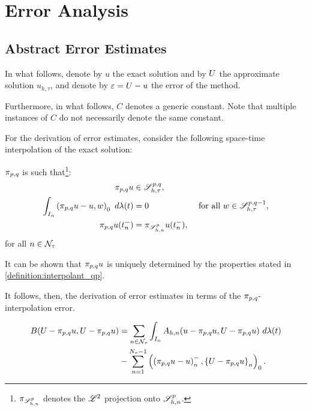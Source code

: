 \newpage
\section{Error Analysis}

\subsection{Abstract Error Estimates}

In what follows, denote by $u$ the exact solution and by $U$ the approximate solution $u_{h, \tau}$, and denote by $\varepsilon = U - u$ the error of the method.

Furthermore, in what follows, $C$ denotes a generic constant. Note that multiple instances of $C$ do not necessarily denote the same constant.

For the derivation of error estimates, consider the following space-time interpolation of the exact solution:

\begin{definition}[$\InterpolantPQ$] \label{definition:interpolant_qp}
    $\InterpolantPQ$ is such that\footnote{$\pi_{\mathscr{S}^p_{h, n}}$ denotes the $\mathscr{L}^{2}$ projection onto $\mathscr{S}^p_{h, n}$.}:
    \begin{align}
        \pi_{p, q} u &\in \mathscr{S}^{p, q}_{h, \tau}, \\
        \int_{I_n} \left( \pi_{p, q} u - u, w \right)_0 ~ d \lambda(t) &= 0 &\text{ for all } w \in \mathscr{S}^{p, q - 1}_{h, \tau}, \\
        \pi_{p, q} u(t_n^-) &= \pi_{\mathscr{S}^p_{h, n}} u(t_n^-),
    \end{align}
    for all $n \in \mathcal{N}_{\tau}$
\end{definition}

It can be shown that $\pi_{p, q} u$ is uniquely determined by the properties stated in \cref{definition:interpolant_qp}.

It follows, then, the derivation of error estimates in terms of the $\InterpolantPQ$-interpolation error.

\begin{lemma}
    \begin{align}
        B(U - \pi_{p, q} u, U - \pi_{p, q} u) &= \sum_{n \in \mathcal{N}_{\tau}} \int_{I_n} A_{h, n}(u - \pi_{p, q} u, U - \pi_{p, q} u) ~ d \lambda(t) \label{equation:error_1} \\
        &- \sum_{n = 1}^{N_{\tau} - 1} \left( \left( \pi_{p, q} u - u \right)_n^-, \left\{ U - \pi_{p, q} u \right\}_n \right)_0. \notag
    \end{align}
\end{lemma}

